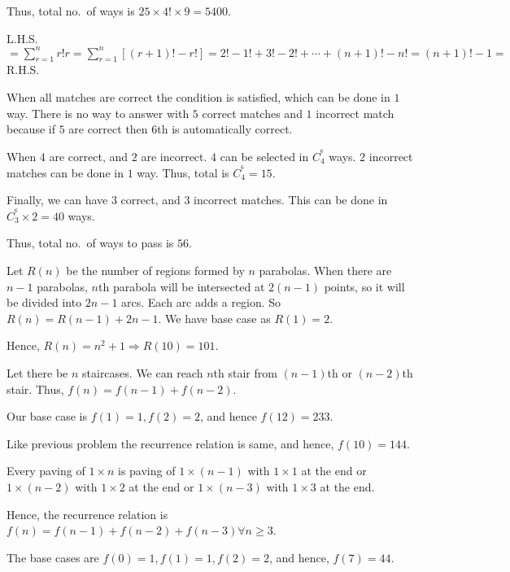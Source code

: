   Thus, total no.\ of ways is $25\times4!\times 9 = 5400$.
\item L.H.S. $=\displaystyle\sum_{r = 1}^nr!r = \sum_{r = 1}^n[(r + 1)! - r!] = 2! - 1! + 3! - 2! + \cdots +
  (n + 1)! - n! = (n + 1)! - 1 =$ R.H.S.
\item When all matches are correct the condition is satisfied, which can be done in $1$ way. There is no way
  to answer with $5$ correct matches and $1$ incorrect match because if $5$ are correct then $6$th is
  automatically correct.

  When $4$ are correct, and $2$ are incorrect. $4$ can be selected in $C_4^^6$ ways. $2$ incorrect matches
  can be done in $1$ way. Thus, total is $C_4^^6 = 15$.

  Finally, we can have $3$ correct, and $3$ incorrect matches. This can be done in $C_3^^6\times2 = 40$
  ways.

  Thus, total no.\ of ways to pass is $56$.
\item Let $R(n)$ be the number of regions formed by $n$ parabolas. When there are $n - 1$ parabolas, $n$th
  parabola will be intersected at $2(n - 1)$ points, so it will be divided into $2n - 1$ arcs. Each arc adds
  a region. So $R(n) = R(n - 1) + 2n - 1$. We have base case as $R(1) = 2$.

  Hence, $R(n) = n^2 + 1 \Rightarrow R(10) = 101$.
\item Let there be $n$ staircases. We can reach $n$th stair from $(n - 1)$th or $(n - 2)$th stair. Thus,
  $f(n) = f(n - 1) + f(n - 2)$.

  Our base case is $f(1) = 1, f(2) = 2$, and hence $f(12) = 233$.
\item Like previous problem the recurrence relation is same, and hence, $f(10) = 144$.
\item Every paving of $1\times n$ is paving of $1\times(n - 1)$ with $1\times1$ at the end or $1\times(n -
  2)$ with $1\times2$ at the end or $1\times(n - 3)$ with $1\times3$ at the end.

  Hence, the recurrence relation is $f(n) = f(n - 1) + f(n - 2) + f(n - 3)\forall n\geq 3$.

  The base cases are $f(0) = 1, f(1) = 1, f(2) = 2$, and hence, $f(7) = 44$.
\stopitemize

